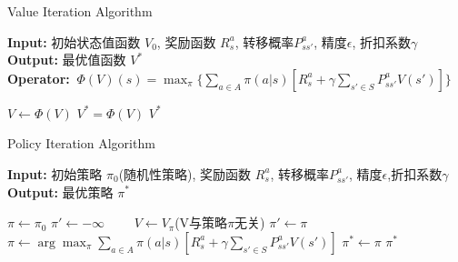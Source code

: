 \documentclass[UTF8]{ctexart}
\begin{document}
\begin{algorithm}[t]
\caption{Value Iteration Algorithm} %
\hspace*{0.02in} {\bf Input:}
初始状态值函数 $V_0$, 奖励函数 $R_s^a$, 转移概率$P_{ss'}^a$, 精度$\epsilon$, 折扣系数$\gamma$ \\
\hspace*{0.02in} {\bf Output:} %
最优值函数 $V^*$ \\
\hspace*{0.02in} {\bf Operator:} $\ \Phi(V)(s) = \max_{\pi}\{\sum_{a\in A} \pi(a|s)[R_s^a + \gamma \sum_{s' \in S}P_{ss'}^a V(s')]\}$
\begin{algorithmic}[1]

		 \State $V \leftarrow \Phi(V)$
\EndWhile
\State $V^* = \Phi(V)$
\State \Return $V^*$
\end{algorithmic}
\end{algorithm}


\begin{algorithm}[t]
\caption{Policy Iteration Algorithm} %
\hspace*{0.02in} {\bf Input:} %
初始策略 $\pi_0$(随机性策略), 奖励函数 $R_s^a$, 转移概率$P_{ss'}^a$, 精度$\epsilon$,折扣系数$\gamma$ \\
\hspace*{0.02in} {\bf Output:} %
最优策略 $\pi^*$
\begin{algorithmic}[1]
\State $\pi \leftarrow \pi_0$%
\State $\pi' \leftarrow -\infty$
　　\State $V \leftarrow V_{\pi}$(V与策略$\pi$无关)
		 \State $\pi' \leftarrow \pi$
    \State $\pi \leftarrow \arg\max_{\pi} \sum_{a\in A} \pi(a|s)[R_s^a + \gamma \sum_{s' \in S}P_{ss'}^a V(s')]$
\EndWhile
\State $\pi^* \leftarrow \pi$
\State \Return $\pi^*$
\end{algorithmic}
\end{algorithm}
\end{document}
